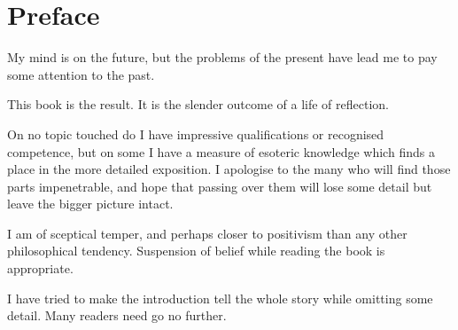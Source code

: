 \chapter*{Preface}


My mind is on the future, but the problems of the present have lead me to pay some attention to the past.

This book is the result.
It is the slender outcome of a life of reflection.

On no topic touched do I have impressive qualifications or recognised competence,
but on some I have a measure of esoteric knowledge which finds a place in the more detailed exposition.
I apologise to the many who will find those parts impenetrable, and hope that passing over them will lose some detail but leave the bigger picture intact.

I am of sceptical temper, and perhaps closer to positivism than any other philosophical tendency.
Suspension of belief while reading the book is appropriate.

I have tried to make the introduction tell the whole story while omitting some detail.
Many readers need go no further.
